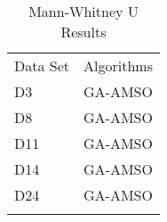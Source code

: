 \begin{table}
\caption{Mann-Whitney U Results}
\label{tbl:mann:whitney:u}
\begin{tabular}{ll}
\noalign{\smallskip}\hline\noalign{\smallskip}
Data Set & Algorithms \\
\noalign{\smallskip}\hline
D3&GA-AMSO\\
D8&GA-AMSO\\
D11&GA-AMSO\\
D14&GA-AMSO\\
D24&GA-AMSO\\
\noalign{\smallskip}\hline
\end{tabular}
\end{table}
